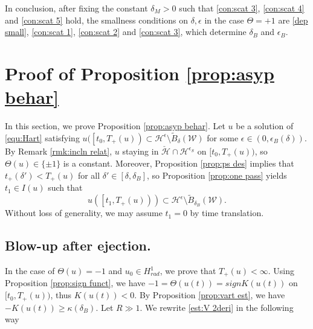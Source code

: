 \documentclass[reqno, 11pt]{amsart}
\numberwithin{equation}{section}
\theoremstyle{plain}
\theoremstyle{definition}
\numberwithin{equation}{section}
\numberwithin{theorem}{section}
\numberwithin{equation}{section}
\numberwithin{equation}{section}
\numberwithin{theorem}{section}
\begin{document}
	In conclusion, after fixing the constant $\delta_{M} >0$ such that  \eqref{con:scat 3}, \eqref{con:scat 4} and \eqref{con:scat 5} hold, the smallness conditions on $\delta,\epsilon$ in the case $\Theta=+1$ are \eqref{dep small}, \eqref{con:scat 1}, \eqref{con:scat 2} and \eqref{con:scat 3}, which determine $\delta_{B}$ and $\epsilon_{B}$.
	
	
	
	
	
	\section{Proof of Proposition \ref{prop:asyp behar}}\label{sect:asymp behr}	
	In this section, we prove Proposition \ref{prop:asyp behar}. Let $u$ be a solution of \eqref{equ:Hart} satisfying $u(\left[t_0,T_+(u)\right)\subset \mathcal{H}^{\epsilon}\setminus \widetilde{B}_{\delta}(\mathcal{W})$ for some $\epsilon\in (0,\epsilon_{B}(\delta))$. By Remark \ref{rmk:incln relat}, $u$ staying in $\check{\mathcal{H}}\cap\mathcal{H}^{\epsilon_S}$ on $[t_0,T_+(u))$, so $\Theta(u)\in\{\pm1\}$ is a constant. Moreover, Proposition \ref{prop:ps des} implies that $t_+(\delta')<T_+(u)$ for all $\delta'\in\left[\delta,\delta_{B}\right]$, so Proposition \ref{prop:one pass} yields $t_1\in I(u)$ such that 
	\begin{equation*}
	u(\left[t_1,T_+(u)  \right)) \subset  \mathcal{H}^{\epsilon}\setminus \widetilde{B}_{\delta_{B}}(\mathcal{W}).
	\end{equation*}
	Without loss of generality, we may assume $t_1=0$ by time translation.
	
	
	
	\subsection{Blow-up after ejection.} In the case of $\Theta(u)=-1$ and $u_0\in H_{rad}^{1}$, we prove that $T_+(u)<\infty$. Using Proposition \ref{prop:sign funct}, we have $-1=\Theta(u(t))=signK(u(t))$ on $[t_0,T_+(u))$, thus $K(u(t))<0$. By Proposition \ref{prop:vart est}, we have $-K(u(t))\geq \kappa(\delta_{B})$. Let $R\gg1$. We rewrite \eqref{est:V 2deri} in the following way
	
\end{document}
